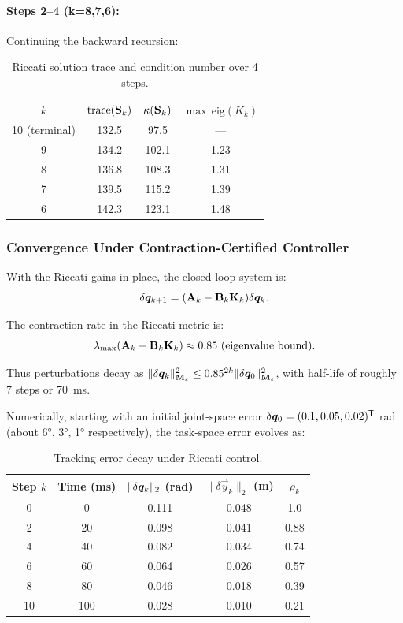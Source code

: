 \paragraph{Steps 2--4 (k=8,7,6):}
Continuing the backward recursion:

\begin{table}[h]
\centering
\caption{Riccati solution trace and condition number over 4 steps.}
\label{tab:riccati-trace}
\begin{tabular}{@{}cccc@{}}
\toprule
$k$ & $\text{trace}(\mathbf{S}_k)$ & $\kappa(\mathbf{S}_k)$ & $\max\,\text{eig}(K_k)$ \\
\midrule
10 (terminal) & 132.5 & 97.5 & --- \\
9 & 134.2 & 102.1 & 1.23 \\
8 & 136.8 & 108.3 & 1.31 \\
7 & 139.5 & 115.2 & 1.39 \\
6 & 142.3 & 123.1 & 1.48 \\
\bottomrule
\end{tabular}
\end{table}

\subsubsection{Convergence Under Contraction-Certified Controller}

With the Riccati gains in place, the closed-loop system is:
\begin{equation}
\delta\bm{q}_{k+1} = (\mathbf{A}_k - \mathbf{B}_k\mathbf{K}_k)\delta\bm{q}_k.
\label{eq:ch8:closed-loop-planar}
\end{equation}

The contraction rate in the Riccati metric is:
\begin{equation}
\lambda_{\max}(\mathbf{A}_k - \mathbf{B}_k\mathbf{K}_k) \approx 0.85~(\text{eigenvalue bound}).
\end{equation}

Thus perturbations decay as $\|\delta\bm{q}_k\|_{\mathbf{M}_\varepsilon}^2 \le 0.85^{2k}\|\delta\bm{q}_0\|_{\mathbf{M}_\varepsilon}^2$,
with half-life of roughly 7 steps or 70~ms.

Numerically, starting with an initial joint-space error $\delta\bm{q}_0 = (0.1, 0.05, 0.02)^{\mathsf{T}}$ rad
(about 6°, 3°, 1° respectively), the task-space error evolves as:

\begin{table}[h]
\centering
\caption{Tracking error decay under Riccati control.}
\label{tab:tracking-convergence}
\begin{tabular}{@{}ccccc@{}}
\toprule
Step $k$ & Time (ms) & $\|\delta\bm{q}_k\|_2$ (rad) & $\|\delta\vec{y}_k\|_2$ (m) & $\rho_k$ \\
\midrule
0 & 0 & 0.111 & 0.048 & 1.0 \\
2 & 20 & 0.098 & 0.041 & 0.88 \\
4 & 40 & 0.082 & 0.034 & 0.74 \\
6 & 60 & 0.064 & 0.026 & 0.57 \\
8 & 80 & 0.046 & 0.018 & 0.39 \\
10 & 100 & 0.028 & 0.010 & 0.21 \\
\bottomrule
\end{tabular}
\end{table}

